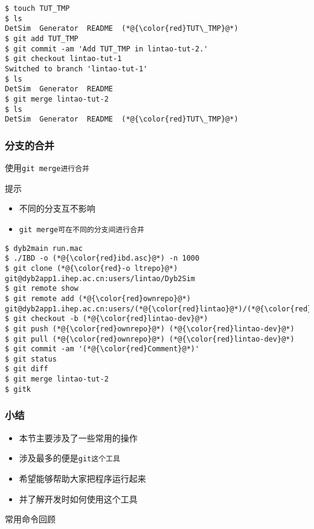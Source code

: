 \newsavebox{\QuickStartDybDevMergeCont}
\begin{lrbox}{\QuickStartDybDevMergeCont}
\begin{lstlisting}
$ touch TUT_TMP
$ ls
DetSim  Generator  README  (*@{\color{red}TUT\_TMP}@*)
$ git add TUT_TMP
$ git commit -am 'Add TUT_TMP in lintao-tut-2.'
$ git checkout lintao-tut-1 
Switched to branch 'lintao-tut-1'
$ ls
DetSim  Generator  README
$ git merge lintao-tut-2 
$ ls
DetSim  Generator  README  (*@{\color{red}TUT\_TMP}@*)
\end{lstlisting}
\end{lrbox}

\begin{frame}
    \frametitle{分支的合并}
    \begin{block}{使用\tt{git merge}进行合并}
        \par\usebox{\QuickStartDybDevMergeCont}
    \end{block}
    \begin{alertblock}{提示}
        \begin{itemize}    
            \item 不同的分支互不影响
            \item \tt{git merge}可在不同的分支间进行合并
        \end{itemize}
    \end{alertblock}
\end{frame}

\newsavebox{\QuickStartSummary}
\begin{lrbox}{\QuickStartSummary}
\begin{lstlisting}
$ dyb2main run.mac
$ ./IBD -o (*@{\color{red}ibd.asc}@*) -n 1000
$ git clone (*@{\color{red}-o ltrepo}@*) git@dyb2app1.ihep.ac.cn:users/lintao/Dyb2Sim
$ git remote show 
$ git remote add (*@{\color{red}ownrepo}@*) git@dyb2app1.ihep.ac.cn:users/(*@{\color{red}lintao}@*)/(*@{\color{red}tutProject}@*)
$ git checkout -b (*@{\color{red}lintao-dev}@*)
$ git push (*@{\color{red}ownrepo}@*) (*@{\color{red}lintao-dev}@*)
$ git pull (*@{\color{red}ownrepo}@*) (*@{\color{red}lintao-dev}@*)
$ git commit -am '(*@{\color{red}Comment}@*)' 
$ git status
$ git diff
$ git merge lintao-tut-2 
$ gitk
\end{lstlisting}
\end{lrbox}

\begin{frame}
    \frametitle{小结}
        \begin{itemize}
            \item 本节主要涉及了一些常用的操作
            \item 涉及最多的便是\tt{git}这个工具
            \item 希望能够帮助大家把程序运行起来
            \item 并了解开发时如何使用这个工具
        \end{itemize}
        \begin{block}{常用命令回顾}
            \par\usebox{\QuickStartSummary}
        \end{block}
\end{frame}
